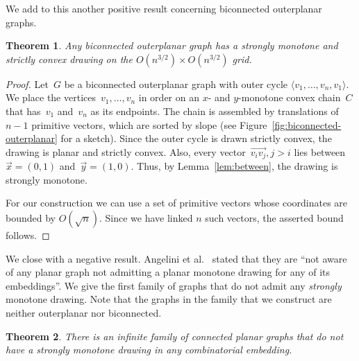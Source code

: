 \documentclass[a4paper,11pt]{article}
\theoremstyle{plain}
\newtheorem{theorem}{Theorem}
\begin{document}
We add to this another positive result concerning biconnected
outerplanar graphs.

\begin{theorem}
  Any biconnected outerplanar graph has a strongly monotone and
  strictly convex drawing on the $O(n^{3/2})\times O(n^{3/2})$ grid.
\end{theorem}

\begin{proof}
  Let~$G$ be a biconnected outerplanar graph with outer cycle
  $\langle v_1,\dots,v_n,v_1\rangle$.
  We place the vertices~$v_1,\dots,v_{n}$
  in order on an $x$- and $y$-monotone convex chain~$C$ that
  has~$v_1$ and~$v_n$ as its endpoints. The chain is assembled by
  translations of $n-1$ primitive vectors, which are sorted by slope
  (see Figure~\ref{fig:biconnected-outerplanar} for a sketch).
  Since the outer cycle is drawn strictly convex, the drawing is planar
  and strictly convex.
Also, every vector~$\overrightarrow{v_iv_j},j>i$ lies between~$\vec x=(0,1)$
  and~$\vec y=(1,0)$. Thus, by Lemma~\ref{lem:between}, the drawing is
  strongly monotone. 
  
  For our construction we can use a set of
primitive vectors whose coordinates are bounded by $O(\sqrt{n})$.
  Since we have linked $n$ such vectors, the
  asserted bound follows.
\end{proof}

We close with a negative result.  Angelini et
al.~\cite[p.~33]{acbfp-mdg-12} stated that they are ``not aware of any
planar graph not admitting a planar monotone drawing for any of its
embeddings''.  We give the first family of graphs that
  do not admit any \emph{strongly} monotone drawing.  Note that the
graphs in the family that we construct are neither outerplanar nor
biconnected.

\begin{theorem}
  There is an infinite family of connected planar graphs
  that do not have a strongly monotone drawing in any combinatorial embedding.
\end{theorem}
\end{document}
